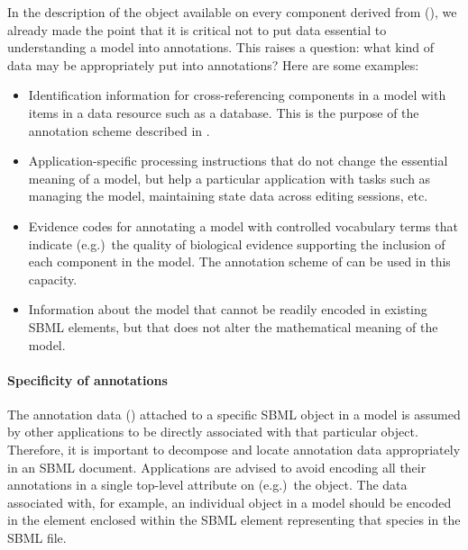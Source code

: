In the description of the \Annotation object available on every
component derived from \SBase (), we
already made the point that it is critical not to put data
essential to understanding a model into annotations.  This raises
a question: what kind of data may be appropriately put into
annotations?  Here are some examples:
\begin{itemize}

\item Identification information for cross-referencing components
  in a model with items in a data resource such as a database.
  This is the purpose of the annotation scheme described in
  .

\item Application-specific processing instructions that do not
  change the essential meaning of a model, but help a particular
  application with tasks such as managing the model, maintaining
  state data across editing sessions, etc.

\item Evidence codes for annotating a model with controlled
  vocabulary terms that indicate (e.g.)\ the quality of biological
  evidence supporting the inclusion of each component in the
  model.  The annotation scheme of
   can be used in this
  capacity.

\item Information about the model that cannot be readily encoded
  in existing SBML elements, but that does not alter the
  mathematical meaning of the model.

\end{itemize}


\paragraph{Specificity of annotations}

The annotation data () attached to a
specific SBML object in a model is assumed by other applications
to be directly associated with that particular object.  Therefore,
it is important to decompose and locate annotation data
appropriately in an SBML document.  Applications are advised to
avoid encoding all their annotations in a single top-level
attribute on (e.g.)\ the \Model object.  The data associated with,
for example, an individual \Species object in a model should be
encoded in the  element enclosed within the
SBML  element representing that species in the
SBML file.


